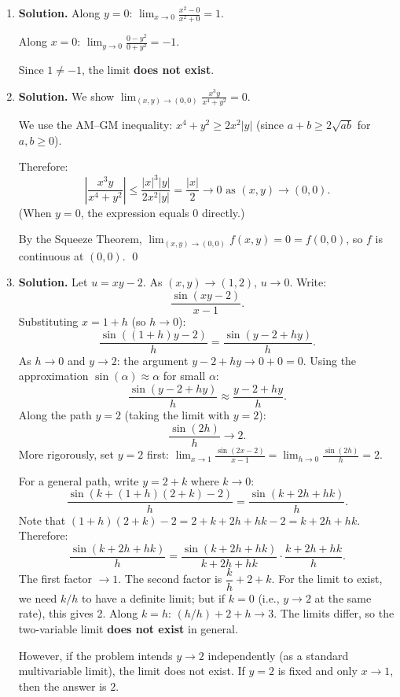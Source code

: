 \begin{enumerate}
\item \textbf{Solution.}
Along $y = 0$: $\displaystyle\lim_{x \to 0} \frac{x^2 - 0}{x^2 + 0} = 1$.

Along $x = 0$: $\displaystyle\lim_{y \to 0} \frac{0 - y^2}{0 + y^2} = -1$.

Since $1 \neq -1$, the limit \textbf{does not exist}.

\item \textbf{Solution.}
We show $\displaystyle\lim_{(x,y)\to(0,0)} \frac{x^3 y}{x^4 + y^2} = 0$.

We use the AM--GM inequality: $x^4 + y^2 \geq 2x^2|y|$ (since $a + b \geq 2\sqrt{ab}$ for $a,b \geq 0$).

Therefore:
\[
\left|\frac{x^3 y}{x^4 + y^2}\right| \leq \frac{|x|^3|y|}{2x^2|y|} = \frac{|x|}{2} \to 0 \text{ as } (x,y) \to (0,0).
\]
(When $y = 0$, the expression equals 0 directly.)

By the Squeeze Theorem, $\displaystyle\lim_{(x,y)\to(0,0)} f(x,y) = 0 = f(0,0)$, so $f$ is continuous at $(0,0)$. \qed

\item \textbf{Solution.}
Let $u = xy - 2$. As $(x,y) \to (1,2)$, $u \to 0$. Write:
\[
\frac{\sin(xy - 2)}{x - 1}.
\]
Substituting $x = 1 + h$ (so $h \to 0$):
\[
\frac{\sin((1+h)y - 2)}{h} = \frac{\sin(y - 2 + hy)}{h}.
\]
As $h \to 0$ and $y \to 2$: the argument $y - 2 + hy \to 0 + 0 = 0$. Using the approximation $\sin(\alpha) \approx \alpha$ for small $\alpha$:
\[
\frac{\sin(y - 2 + hy)}{h} \approx \frac{y - 2 + hy}{h}.
\]
Along the path $y = 2$ (taking the limit with $y = 2$):
\[
\frac{\sin(2h)}{h} \to 2.
\]
More rigorously, set $y = 2$ first: $\displaystyle\lim_{x \to 1} \frac{\sin(2x - 2)}{x-1} = \lim_{h \to 0} \frac{\sin(2h)}{h} = 2$.

For a general path, write $y = 2 + k$ where $k \to 0$:
\[
\frac{\sin(k + (1+h)(2+k) - 2)}{h} = \frac{\sin(k + 2h + hk)}{h}.
\]
Note that $(1+h)(2+k) - 2 = 2 + k + 2h + hk - 2 = k + 2h + hk$. Therefore:
\[
\frac{\sin(k + 2h + hk)}{h} = \frac{\sin(k + 2h + hk)}{k + 2h + hk} \cdot \frac{k + 2h + hk}{h}.
\]
The first factor $\to 1$. The second factor is $\dfrac{k}{h} + 2 + k$. For the limit to exist, we need $k/h$ to have a definite limit; but if $k = 0$ (i.e., $y \to 2$ at the same rate), this gives 2. Along $k = h$: $(h/h) + 2 + h \to 3$. The limits differ, so the two-variable limit \textbf{does not exist} in general.

However, if the problem intends $y \to 2$ independently (as a standard multivariable limit), the limit does not exist. If $y = 2$ is fixed and only $x \to 1$, then the answer is $\boxed{2}$.


\end{enumerate}
